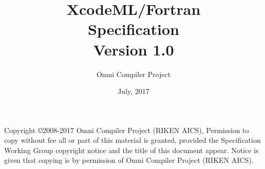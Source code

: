 \documentclass[a4paper,11pt,twoside]{article}
\title{{\Huge XcodeML/Fortran}\\
Specification\\
\vspace{2cm}
Version 1.0\\ }
\author{
\Large Omni Compiler Project\\
}
\date{\vspace{4cm}\Large July, 2017}
\begin{document}
\maketitle

Copyright \copyright 2008-2017 Omni Compiler Project (RIKEN AICS),
Permission to copy without fee all or part of this material is granted,
provided the {\XMP} Specification Working Group copyright notice and the
title of this document appear. Notice is given that copying is by permission
of Omni Compiler Project (RIKEN AICS).

\clearpage

\cleardoublepage

\tableofcontents
\listoffigures
\listoftables



\newpage
\mbox{}\newpage

\pagestyle{fancy}
\fancyhead{} %
\fancyhead[RE]{\leftmark}
\fancyhead[LO]{\rightmark}
\fancyhead[LE,RO]{\thepage}
\fancyfoot{} %
\renewcommand{\headrulewidth}{0pt}
\renewcommand{\footrulewidth}{0pt}













\cleardoublepage





\end{document}

